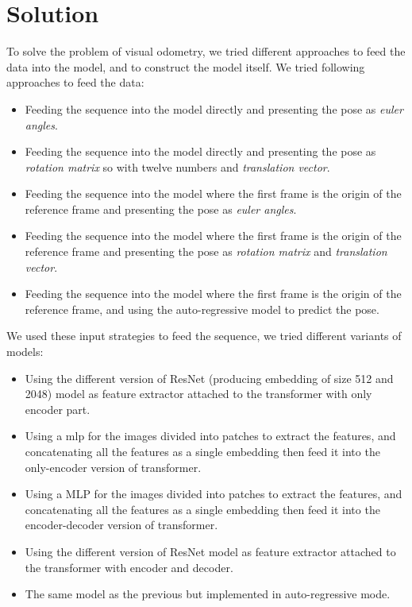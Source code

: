 
\section{Solution}\label{sec:solution}
To solve the problem of visual odometry, we tried different approaches to feed the data into the model, and to construct the model itself.
We tried following approaches to feed the data:
\begin{itemize}
    \item Feeding the sequence into the model directly and presenting the pose as \emph{euler angles}.
    \item Feeding the sequence into the model directly and presenting the pose as \emph{rotation matrix} so with twelve numbers and \emph{translation vector}.
    \item Feeding the sequence into the model where the first frame is the origin of the reference frame and presenting the pose as \emph{euler angles}.
    \item Feeding the sequence into the model where the first frame is the origin of the reference frame and presenting the pose as \emph{rotation matrix} and \emph{translation vector}.
    \item Feeding the sequence into the model where the first frame is the origin of the reference frame, and using the auto-regressive model to predict the pose.
\end{itemize}

We used these input strategies to feed the sequence, we tried different variants of models:
\begin{itemize}
    \item Using the different version of ResNet (producing \gls{embedding} of size 512 and 2048) model as feature extractor attached to the transformer with only encoder part.
    \item Using a \gls{mlp} for the images divided into patches to extract the features, and concatenating all the features as a single embedding then feed it into the only-encoder version of transformer.
    \item Using a MLP for the images divided into patches to extract the features, and concatenating all the features as a single embedding then feed it into the encoder-decoder version of transformer.
    \item Using the different version of ResNet model as feature extractor attached to the transformer with encoder and decoder.
    \item The same model as the previous but implemented in \gls{auto-regressive} mode.
\end{itemize}